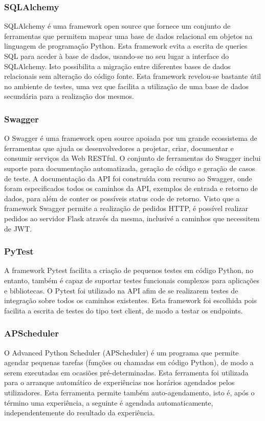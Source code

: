 \subsubsection{SQLAlchemy}
SQLAlchemy é uma framework open source que fornece um conjunto de ferramentas que permitem mapear uma base de dados relacional em objetos na linguagem de programação Python.\newline
Esta framework evita a escrita de queries SQL para aceder à base de dados, usando-se no seu lugar a interface do SQLAlchemy. Isto possibilita a migração entre diferentes bases de dados relacionais sem alteração do código fonte.\newline
Esta framework revelou-se bastante útil no ambiente de testes, uma vez que facilita a utilização de uma base de dados secundária para a realização dos mesmos.
\subsubsection{Swagger}
O Swagger é uma framework open source apoiada por um grande ecossistema de ferramentas que ajuda os desenvolvedores a projetar, criar, documentar e consumir serviços da Web RESTful. O conjunto de ferramentas do Swagger inclui suporte para documentação automatizada, geração de código e geração de casos de teste. \newline
A documentação da API foi construída com recurso ao Swagger, onde foram especificados todos os caminhos da API, exemplos de entrada e retorno de dados, para além de conter os possíveis status code de retorno. \newline
Visto que a framework Swagger permite a realização de pedidos HTTP, é possível realizar pedidos ao servidor Flask através da mesma, inclusivé a caminhos que necessitem de JWT.

\subsubsection{PyTest}
A framework Pytest facilita a criação de pequenos testes em código Python, no entanto, também é capaz de suportar  testes funcionais complexos para aplicações e bibliotecas.\newline
O Pytest foi utilizado na API afim de se realizarem testes de integração sobre todos os caminhos existentes.  Esta framework foi escolhida pois facilita a escrita de testes do tipo test client, de modo a testar os endpoints. 

\subsubsection{APScheduler}
O Advanced Python Scheduler (APScheduler) é um programa que permite agendar pequenas tarefas (funções ou chamadas em código Python), de modo a serem executadas em ocasiões pré-determinadas.\newline
Esta ferramenta foi utilizada para o arranque automático de experiências nos horários agendados pelos utilizadores. Esta ferramenta permite também auto-agendamento, isto é, após o término uma experiência, a seguinte é agendada automaticamente, independentemente do resultado da experiência.

